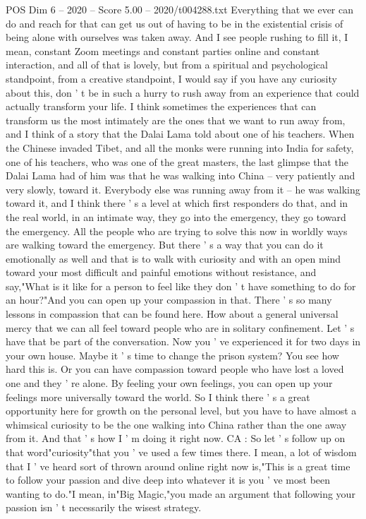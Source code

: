 \begin{textsample}{POS Dim 6 – 2020 – Score 5.00 – 2020/t004288.txt}
Everything that we ever can do and reach for that can get us out of having to be in the existential crisis of being alone with ourselves was taken away.
And I see people rushing to fill it, I mean, constant Zoom meetings and constant parties online and constant interaction, and all of that is lovely, but from a spiritual and psychological standpoint, from a creative standpoint, I would say if you have any curiosity about this, don ' t be in such a hurry to rush away from an experience that could actually transform your life.
I think sometimes the experiences that can transform us the most intimately are the ones that we want to run away from, and I think of a story that the Dalai Lama told about one of his teachers.
When the Chinese invaded Tibet, and all the monks were running into India for safety, one of his teachers, who was one of the great masters, the last glimpse that the Dalai Lama had of him was that he was walking into China -- very patiently and very slowly, toward it.
Everybody else was running away from it -- he was walking toward it, and I think there ' s a level at which first responders do that, and in the real world, in an intimate way, they go into the emergency, they go toward the emergency.
All the people who are trying to solve this now in worldly ways are walking toward the emergency.
But there ' s a way that you can do it emotionally as well and that is to walk with curiosity and with an open mind toward your most difficult and painful emotions without resistance, and say,"What is it like for a person to feel like they don ' t have something to do for an hour?"And you can open up your compassion in that.
There ' s so many lessons in compassion that can be found here.
How about a general universal mercy that we can all feel toward people who are in solitary confinement.
Let ' s have that be part of the conversation.
Now you ' ve experienced it for two days in your own house.
Maybe it ' s time to change the prison system?
You see how hard this is.
Or you can have compassion toward people who have lost a loved one and they ' re alone.
By feeling your own feelings, you can open up your feelings more universally toward the world.
So I think there ' s a great opportunity here for growth on the personal level, but you have to have almost a whimsical curiosity to be the one walking into China rather than the one away from it.
And that ' s how I ' m doing it right now.
CA : So let ' s follow up on that word"curiosity"that you ' ve used a few times there.
I mean, a lot of wisdom that I ' ve heard sort of thrown around online right now is,"This is a great time to follow your passion and dive deep into whatever it is you ' ve most been wanting to do."I mean, in"Big Magic,"you made an argument that following your passion isn ' t necessarily the wisest strategy.

\end{textsample}
